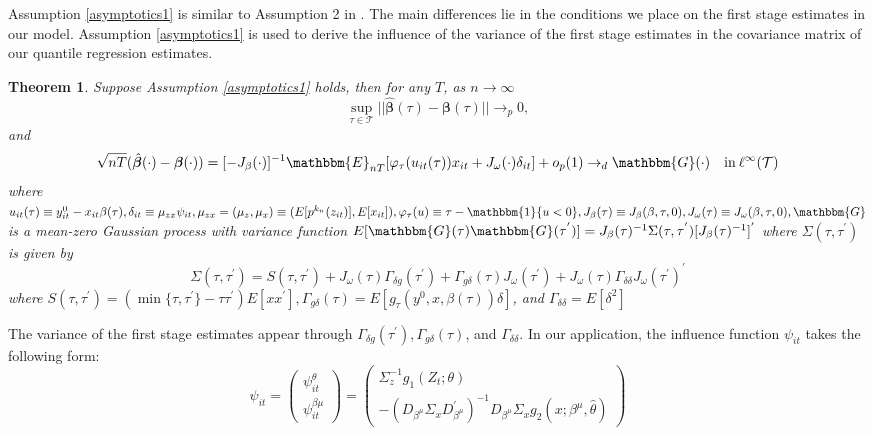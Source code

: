 \documentclass[11pt]{article}
\newtheorem{theorem}{Theorem}[section]
\begin{document}
Assumption \ref{asymptotics1} is similar to Assumption 2 in \cite{Chernozhukov2006}. The main differences lie in the conditions we place on the first stage estimates in our model. Assumption \ref{asymptotics1} is used to derive the influence of the variance of the first stage estimates in the covariance matrix of our quantile regression estimates. 
\begin{theorem}
Suppose Assumption \ref{asymptotics1} holds, then for any $T$, as $n\rightarrow\infty$
\begin{equation*}
\underset{\tau\in\mathcal{T}}{\operatorname{\sup}}||\hat{\boldsymbol{\beta}}(\tau)-\boldsymbol{\beta}(\tau)||\rightarrow_{p} 0,
\end{equation*}
and
\begin{equation*}
\sqrt{nT}(\hat{\boldsymbol{\beta}}(\cdot)-\boldsymbol{\beta}(\cdot))=[-J_{\beta}(\cdot)]^{-1}\mathbbm{E}_{nT}[\varphi_{\tau}(u_{it}(\tau))x_{it}+J_{\omega}(\cdot)\delta_{it}]+o_{p}(1)\rightarrow_{d} \mathbbm{G}(\cdot) \quad \text{in}\: \ell^{\infty}(\mathcal{T})
\end{equation*}
where $u_{it}(\tau)\equiv y^{0}_{it}-x_{it}\beta(\tau), \delta_{it}\equiv\mu_{zx}\psi_{it}, \mu_{zx}=(\mu_{z}, \mu_{x})\equiv(E[p^{k_{n}}(z_{it})], E[x_{it}]), \varphi_{\tau}(u)\equiv\tau-\mathbbm{1}\{u<0\}, J_{\beta}(\tau)\equiv J_{\beta}(\beta, \tau, 0), J_{\omega}(\tau)\equiv J_{\omega}(\beta, \tau, 0), \mathbbm{G}$ is a mean-zero Gaussian process with variance function $E[\mathbbm{G}(\tau)\mathbbm{G}(\tau^{'})]=J_{\beta}(\tau)^{-1}\Sigma(\tau, \tau^{'})[J_{\beta}(\tau)^{-1}]^{'}$ where $\Sigma(\tau, \tau^{'})$ is given by
\begin{equation*}
\Sigma(\tau, \tau^{'})=S(\tau,\tau^{'})+J_{\omega}(\tau)\Gamma_{\delta g}(\tau^{'})+\Gamma_{g\delta}(\tau)J_{\omega}(\tau^{'})+J_{\omega}(\tau)\Gamma_{\delta\delta}J_{\omega}(\tau^{'})^{'}
\end{equation*}
where $S(\tau,\tau^{'})=(\min\{\tau,\tau^{'}\}-\tau\tau^{'})E[xx^{'}], \Gamma_{g\delta}(\tau)=E[g_{\tau}(y^{0},x,\beta(\tau))\delta]$, and $\Gamma_{\delta\delta}=E[\delta^{2}]$
\end{theorem}
The variance of the first stage estimates appear through $\Gamma_{\delta g}(\tau^{'}), \Gamma_{g\delta}(\tau)$, and $\Gamma_{\delta\delta}$. In our application, the influence function $\psi_{it}$ takes the following form:
\begin{equation*}
\psi_{it}=
\begin{pmatrix}
\psi^{\theta}_{it}\\
\psi^{\beta{\mu}}_{it}
\end{pmatrix}
=
\begin{pmatrix}
\Sigma_{z}^{-1}g_{1}(Z_{t};\theta)\\
-(D_{\beta^{\mu}}\Sigma_{x}D_{\beta^{\mu}}^{'})^{-1}D_{\beta^{\mu}}\Sigma_{x}g_{2}(x; \beta^{\mu}, \hat{\theta})
\end{pmatrix}
\end{equation*}
\end{document}

